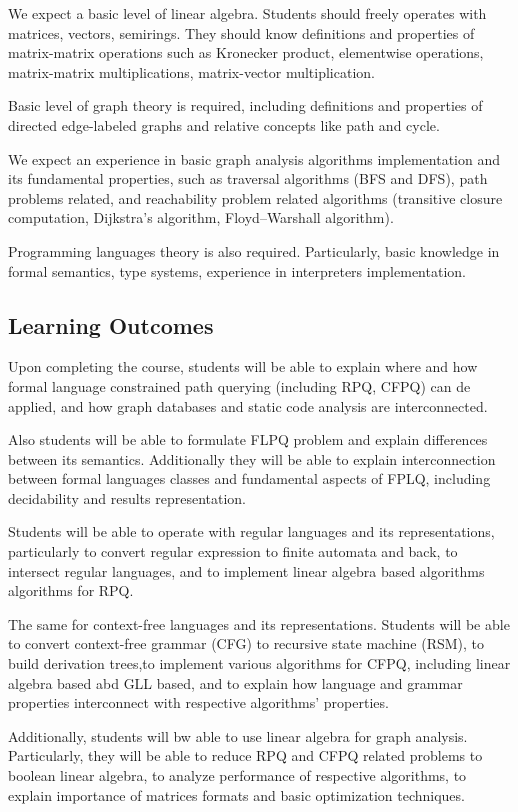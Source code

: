 \documentclass[sigconf]{acmart}
\begin{document}
We expect a basic level of linear algebra.
Students should freely operates with matrices, vectors, semirings.
They should know definitions and properties of matrix-matrix operations such as Kronecker product, elementwise operations, matrix-matrix multiplications, matrix-vector multiplication. 

Basic level of graph theory is required, including definitions and properties of directed edge-labeled graphs and relative concepts like path and cycle.

We expect an experience in basic graph analysis algorithms implementation and its fundamental properties, such as traversal algorithms (BFS and DFS), path problems related, and reachability problem related algorithms (transitive closure computation, Dijkstra's algorithm, Floyd–Warshall algorithm).

Programming languages theory is also required. 
Particularly, basic knowledge in formal semantics, type systems, experience in interpreters implementation.

\subsection{Learning Outcomes}

Upon completing the course, students will be able to explain where and how formal language constrained path querying (including RPQ, CFPQ) can de applied, and how graph databases and static code analysis are interconnected.

Also students will be able to formulate FLPQ problem and explain differences between its semantics.
Additionally they will be able to explain interconnection between formal languages classes and fundamental aspects of FPLQ, including decidability and results representation.

Students will be able to operate with regular languages and its representations, particularly to convert regular expression to finite automata and back, to intersect regular languages, and to implement linear algebra based algorithms algorithms for RPQ. 

The same for context-free languages and its representations. 
Students will be able to convert context-free grammar (CFG) to recursive state machine (RSM), to build derivation trees,to implement various algorithms for CFPQ, including linear algebra based abd GLL based, and to explain how language and grammar properties interconnect with respective algorithms' properties. 

Additionally, students will bw able to use linear algebra for graph analysis. 
Particularly, they will be able to reduce RPQ and CFPQ related problems to boolean linear algebra, to analyze performance of respective algorithms, to explain importance of matrices formats and basic optimization techniques.
\end{document}
